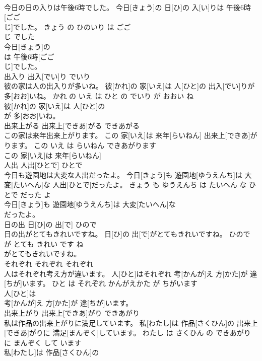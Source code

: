 \documentclass[8pt]{extreport}
\begin{document}
\begin{CJK}{UTF8}{min}
\\	今日の日の入りは午後6時でした。	今日[きょう]の 日[ひ]の 入[い]りは 午後6時[ごご 
\\	じ]でした。	きょう の ひのいり は ごご 
\\	じ でした	
\\	今日[きょう]の
\\	は 午後6時[ごご 
\\	じ]でした。			
\\	出入り	出入[でい]り	でいり	
\\	彼の家は人の出入りが多いね。	彼[かれ]の 家[いえ]は 人[ひと]の 出入[でい]りが 多[おお]いね。	かれ の いえ は ひと の でいり が おおい ね	
\\	彼[かれ]の 家[いえ]は 人[ひと]の
\\	が 多[おお]いね。			
\\	出来上がる	出来上[できあ]がる	できあがる	
\\	この家は来年出来上がります。	この 家[いえ]は 来年[らいねん] 出来上[できあ]がります。	この いえ は らいねん できあがります	
\\	この 家[いえ]は 来年[らいねん]
\\	人出	人出[ひとで]	ひとで	
\\	今日も遊園地は大変な人出だったよ。	今日[きょう]も 遊園地[ゆうえんち]は 大変[たいへん]な 人出[ひとで]だったよ。	きょう も ゆうえんち は たいへん な ひとで だった よ	
\\	今日[きょう]も 遊園地[ゆうえんち]は 大変[たいへん]な
\\	だったよ。			
\\	日の出	日[ひ]の 出[で]	ひので	
\\	日の出がとてもきれいですね。	日[ひ]の 出[で]がとてもきれいですね。	ひので が とても きれい です ね	
\\	がとてもきれいですね。			
\\	それぞれ	それぞれ	それぞれ	
\\	人はそれぞれ考え方が違います。	人[ひと]はそれぞれ 考[かんが]え 方[かた]が 違[ちが]います。	ひと は それぞれ かんがえかた が ちがいます	
\\	人[ひと]は
\\	考[かんが]え 方[かた]が 違[ちが]います。			
\\	出来上がり	出来上[できあ]がり	できあがり	
\\	私は作品の出来上がりに満足しています。	私[わたし]は 作品[さくひん]の 出来上[できあ]がりに 満足[まんぞく]しています。	わたし は さくひん の できあがり に まんぞく して います	
\\	私[わたし]は 作品[さくひん]の

\end{CJK}
\end{document}
